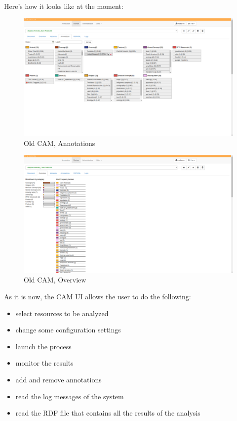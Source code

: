 \documentclass[12pt,svgnames]{memoir}
\begin{document}
Here's how it looks like at the moment:

\begin{figure}[htbp]
\centering
\includegraphics{./src/img/oldCAM-annotations.png}
\caption{Old CAM, Annotations}
\end{figure}

\begin{figure}[htbp]
\centering
\includegraphics{./src/img/oldCAM-overview.png}
\caption{Old CAM, Overview}
\end{figure}

As it is now, the CAM UI allows the user to do the following:

\begin{itemize}
\itemsep1pt\parskip0pt
\item
  select resources to be analyzed
\item
  change some configuration settings
\item
  launch the process
\item
  monitor the results
\item
  add and remove annotations
\item
  read the log messages of the system
\item
  read the RDF file that contains all the results of the analysis
\end{itemize}
\end{document}
